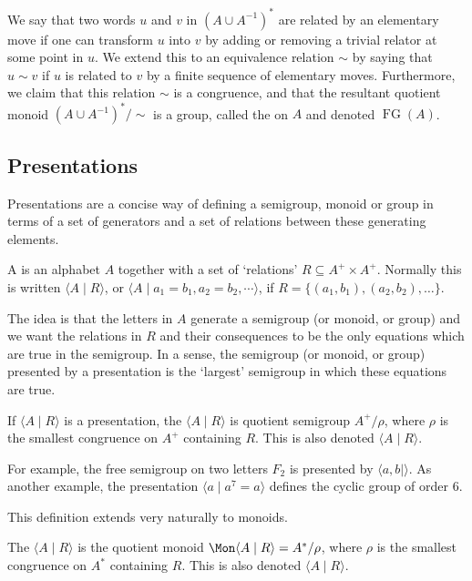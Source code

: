 \documentclass[noindex,noinsetproof,12pt]{lmaths}
\DeclareMathOperator{\FG}{FG}
\begin{document}
We say that two words $u$ and $v$ in $(A \cup A^{-1})^*$ are related by an elementary move if one can transform $u$ into $v$ by adding or removing a trivial relator at some point in $u$. We extend this to an equivalence relation $\sim$ by saying that $u \sim v$ if $u$ is related to $v$ by a finite sequence of elementary moves.  Furthermore, we claim that this relation $\sim$ is a congruence, and that the resultant quotient monoid $(A \cup A^{-1})^*/{\sim}$ is a group, called the  on $A$ and denoted $\FG(A)$.

\subsection{Presentations}

Presentations are a concise way of defining a semigroup, monoid or group in terms of a set of generators and a set of relations between these generating elements.

\begin{defn}
	A  is an alphabet $A$ together with a set of `relations' $R \subseteq A^+ \times A^+$. Normally this is written $\langle A \mid R\rangle$, or $\langle A \mid a_1 = b_1, a_2 = b_2, \cdots \rangle$, if $R = \{(a_1, b_1), (a_2, b_2), \ldots\}$.
\end{defn}

The idea is that the letters in $A$ generate a semigroup (or monoid, or group) and we want the relations in $R$ and their consequences to be the only equations which are true in the semigroup. In a sense, the semigroup (or monoid, or group) presented by a presentation is the `largest' semigroup in which these equations are true.

\begin{defn}
	If $\langle A \mid R \rangle$ is a presentation, the  $\langle A \mid R\rangle$ is quotient semigroup $A^+/\rho$, where $\rho$ is the smallest congruence on $A^+$ containing $R$. This is also denoted $\langle A \mid R \rangle$.
\end{defn}

For example, the free semigroup on two letters $F_2$ is presented by $\langle a, b \mid \rangle$. As another example, the presentation $\langle a \mid a^7 = a \rangle$ defines the cyclic group of order 6.

This definition extends very naturally to monoids.

\begin{defn}
	The  $\langle A \mid R\rangle$ is the quotient monoid $\Mon \langle A \mid R\rangle = A^*/\rho$, where $\rho$ is the smallest congruence on $A^*$ containing $R$. This is also denoted $\langle A \mid R \rangle$.
\end{defn}
\end{document}
